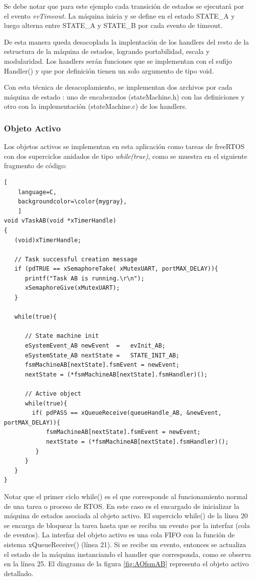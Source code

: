 Se debe notar que para este ejemplo cada transición de estados se ejecutará por el evento \textit{evTimeout}. La máquina inicia y se define en el estado STATE\_A y luego alterna entre STATE\_A y STATE\_B por cada evento de timeout.

De esta manera queda desacoplada la implentación de los handlers del resto de la estructura de la máquina de estados, logrando portabilidad, escala y modularidad. Los handlers serán funciones que se implementan con el sufijo Handler() y que por definición tienen un solo argumento de tipo void.

Con esta técnica de desacoplamiento, se implementan dos archivos por cada máquina de estado : uno de encabezados (stateMachine.h) con las definiciones y otro con la implementación (stateMachine.c) de los handlers.




\subsubsection{Objeto Activo}
	
Los objetos activos se implementan en esta aplicación como tareas de freeRTOS con dos superciclos anidados de tipo \textit{while(true)}, como se muestra en el siguiente fragmento de código: 

\begin{lstlisting}[
	language=C, 
	backgroundcolor=\color{mygray},
	]
void vTaskAB(void *xTimerHandle)
{
   (void)xTimerHandle;

   // Task successful creation message
   if (pdTRUE == xSemaphoreTake( xMutexUART, portMAX_DELAY)){
      printf("Task AB is running.\r\n");
      xSemaphoreGive(xMutexUART);
   }

   while(true){
      
      // State machine init
      eSystemEvent_AB newEvent	=	evInit_AB;
      eSystemState_AB nextState	=	STATE_INIT_AB;
      fsmMachineAB[nextState].fsmEvent = newEvent; 
      nextState = (*fsmMachineAB[nextState].fsmHandler)();

      // Active object
      while(true){
        if( pdPASS == xQueueReceive(queueHandle_AB, &newEvent, portMAX_DELAY)){
            fsmMachineAB[nextState].fsmEvent = newEvent; 
            nextState = (*fsmMachineAB[nextState].fsmHandler)();
         }
      }
   }
}
\end{lstlisting}

Notar que el primer ciclo while() es el que corresponde al funcionamiento normal de una tarea o proceso de RTOS. En este caso es el encargado de inicializar la máquina de estados asociada al objeto activo. El superciclo while() de la línea 20 se encarga de bloquear la tarea hasta que se reciba un evento por la interfaz (cola de eventos). La interfaz del objeto activo es una cola FIFO con la función de sistema xQueueReceive() (línea 21). Si se recibe un evento, entonces se actualiza el estado de la máquina instanciando el handler que corresponda, como se observa en la línea 25. El diagrama de la figura \ref{fig:AOfsmAB} representa el objeto activo detallado. 

